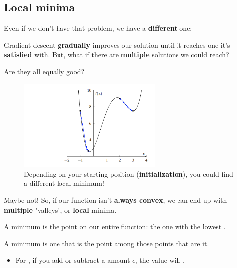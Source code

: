 \subsection*{Local minima}
    
    Even if we don't have that problem, we have a \textbf{different} one:
    
    Gradient descent \textbf{gradually} improves our solution until it reaches one it's \textbf{satisfied} with. But, what if there are \textbf{multiple} solutions we could reach?
    
    Are they all equally good?
    
    \begin{figure}[H]
    \centering
        \includegraphics[width=70mm,scale=0.5]{images/gradient_descent_images/Two_Local_Minima.png}
    
    \caption*{Depending on your starting position (\textbf{initialization}), you could find a different local minimum!}
    \end{figure}
    
    Maybe not! So, if our function isn't \textbf{always convex}, we can end up with \textbf{multiple} "valleys", or \textbf{local} minima.\\
    
    \begin{definition}
        A  minimum is the  point on our entire function: the one with the lowest .
        
        A  minimum is one that is the  point among those points that are  it.
        
        \begin{itemize}
            \item For , if you add or subtract a  amount $\epsilon$, the value will .
        \end{itemize}
        
    \end{definition}
    
